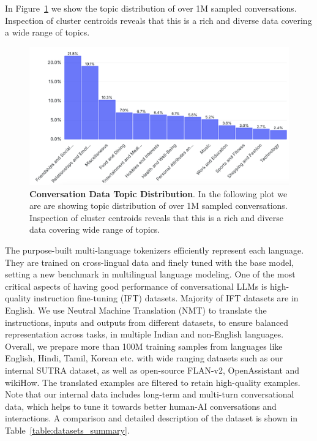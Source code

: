 \documentclass{article}
\begin{document}
In Figure~\ref{fig:conversation_data_distribution} we show the topic distribution of over 1M sampled conversations.
Inspection of cluster centroids reveals that this is a rich and diverse data covering a wide range of topics. 
\begin{figure}[tbp]
\centering
\includegraphics[width=\linewidth]{images/conversation_data_distribution.png}
  \caption{\textbf{Conversation Data Topic Distribution}. In the following plot we are are showing topic distribution of over 1M sampled conversations. Inspection of cluster centroids reveals that this is a rich and diverse data covering wide range of topics.}
\label{fig:conversation_data_distribution}
\end{figure}

The purpose-built multi-language tokenizers efficiently represent each language. They are trained on cross-lingual data and finely tuned with the base model, setting a new benchmark in multilingual language modeling.  
One of the most critical aspects of having good performance of conversational LLMs is high-quality instruction fine-tuning (IFT) datasets.
Majority of IFT datasets are in English. We use Neutral Machine Translation (NMT) to translate the instructions, inputs and outputs from different datasets, to ensure balanced representation across tasks, in multiple Indian and non-English languages.
Overall, we prepare more than 100M training samples from languages like English, Hindi, Tamil, Korean etc. with wide ranging datasets such as our internal SUTRA dataset, as well as open-source FLAN-v2, OpenAssistant and wikiHow. The translated examples are filtered to retain high-quality examples.
Note that our internal data includes long-term and multi-turn conversational data, which helps to tune it towards better human-AI conversations and interactions.
A comparison and detailed description of the dataset is shown in Table~\ref{table:datasets_summary}.
 
\end{document}
